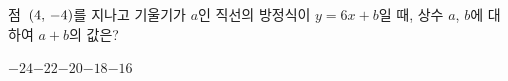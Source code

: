 점~$(4,\mkern3mu -4)$를 지나고 기울기가 $a$인 직선의 방정식이 $y=6x+b$일 때, 상수 $a$, $b$에 대하여 $a+b$의 값은?
\begin{choices32}{$-24$}{$-22$}{$-20$}{$-18$}{$-16$}\end{choices32}
